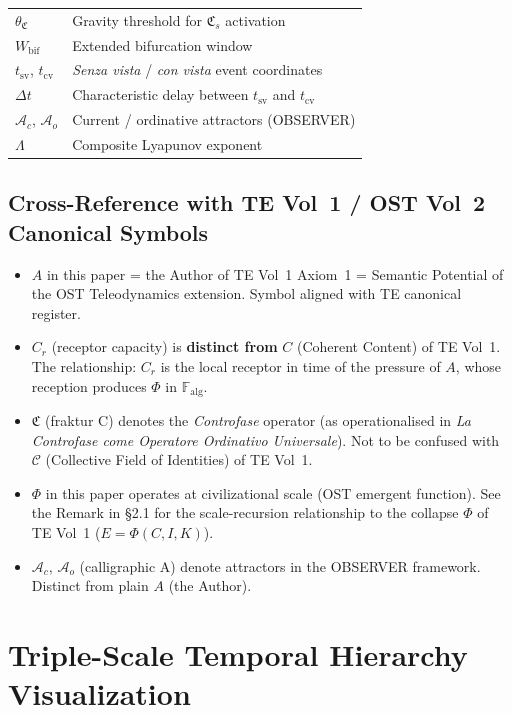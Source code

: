 \documentclass[12pt,a4paper]{article}
\newcommand{\reag}{C_r}
\newcommand{\Mpot}{A}
\newcommand{\Falg}{\mathbb{F}_{\mathrm{alg}}}
\newcommand{\CF}{\mathfrak{C}}           %
\newcommand{\CFs}{\mathfrak{C}_s}        %
\newcommand{\thetaCF}{\theta_{\mathfrak{C}}}   %
\newcommand{\Ac}{\mathcal{A}_c}          %
\newcommand{\Ao}{\mathcal{A}_o}          %
\begin{document}
\begin{table}[H]
\begin{tabular}{@{}lp{9cm}@{}}
$\thetaCF$ & Gravity threshold for $\CFs$ activation \\
$W_{\mathrm{bif}}$ & Extended bifurcation window \\
$t_{\mathrm{sv}}$, $t_{\mathrm{cv}}$ & \emph{Senza vista} / \emph{con vista} event coordinates \\
$\Delta t$ & Characteristic delay between $t_{\mathrm{sv}}$ and $t_{\mathrm{cv}}$ \\
$\Ac$, $\Ao$ & Current / ordinative attractors (OBSERVER) \\
$\Lambda$ & Composite Lyapunov exponent \\
\bottomrule
\end{tabular}
\end{table}

\subsection*{Cross-Reference with TE Vol~1 / OST Vol~2 Canonical Symbols}

\begin{itemize}[leftmargin=2em]
    \item $\Mpot$ in this paper = the Author of TE Vol~1 Axiom~1 = Semantic Potential of the OST Teleodynamics extension. Symbol aligned with TE canonical register.
    \item $\reag$ (receptor capacity) is \textbf{distinct from} $C$ (Coherent Content) of TE Vol~1. The relationship: $\reag$ is the local receptor in time of the pressure of $\Mpot$, whose reception produces $\Phi$ in $\Falg$.
    \item $\CF$ (fraktur C) denotes the \textit{Controfase} operator (as operationalised in \emph{La Controfase come Operatore Ordinativo Universale}). Not to be confused with $\mathcal{C}$ (Collective Field of Identities) of TE Vol~1.
    \item $\Phi$ in this paper operates at civilizational scale (OST emergent function). See the Remark in \S2.1 for the scale-recursion relationship to the collapse $\Phi$ of TE Vol~1 ($E = \Phi(C, I, K)$).
    \item $\Ac$, $\Ao$ (calligraphic A) denote attractors in the OBSERVER framework. Distinct from plain $\Mpot$ (the Author).
\end{itemize}

\section{Triple-Scale Temporal Hierarchy Visualization}\label{app:hierarchy}
\end{document}
